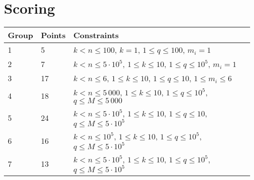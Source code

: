 \section*{Scoring}
\begin{tabular}{|l|l|l|}
    \hline
    Group & Points & Constraints \\ \hline
    1     & 5      & $k < n \leq 100$,           $k = 1$,            $1 \leq q \leq 100$,  $m_i = 1$ \\ \hline %
    2     & 7      & $k < n \leq 5 \cdot 10^5$,  $1 \leq k \leq 10$, $1 \leq q \leq 10^5$, $m_i = 1$ \\ \hline %
    3     & 17     & $k < n \leq 6$,             $1 \leq k \leq 10$, $1 \leq q \leq 10$,   $1 \leq m_i \leq 6$  \\ \hline %
    4     & 18     & $k < n \leq 5\,000$,        $1 \leq k \leq 10$, $1 \leq q \leq 10^5$, $q \leq M \leq 5\,000$ \\ \hline %
    5     & 24     & $k < n \leq 5 \cdot 10^5$,  $1 \leq k \leq 10$, $1 \leq q \leq 10$,   $q \leq M \leq 5 \cdot 10^5$ \\ \hline %
    6     & 16     & $k < n \leq 10^5$,          $1 \leq k \leq 10$, $1 \leq q \leq 10^5$, $q \leq M \leq 5 \cdot 10^5$ \\ \hline %
    7     & 13     & $k < n \leq 5 \cdot 10^5$,  $1 \leq k \leq 10$, $1 \leq q \leq 10^5$, $q \leq M \leq 5 \cdot 10^5$ \\ \hline %
\end{tabular}

